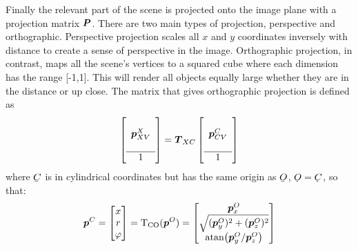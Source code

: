 Finally the relevant part of the scene is projected onto the image plane with a projection matrix $\P$. There are two main types of projection, perspective and orthographic. Perspective projection scales all $x$ and $y$ coordinates inversely with distance to create a sense of perspective in the image. Orthographic projection, in contrast, maps all the scene's vertices to a squared cube where each dimension has the range [-1,1]. This will render all objects equally large whether they are in the distance or up close. The matrix that gives orthographic projection is defined as
%
\begin{align}
\left[\begin{array}{c}
\\\dvec{p}_{XV}^{X}\\\\\hline 1
\end{array}\right]
= \mat{T}_{XC}
\left[\begin{array}{c}
\\\dvec{p}_{CV}^{C}\\\\\hline 1
\end{array}\right]
\end{align}
%
where $\ubar{C}$ is in cylindrical coordinates but has the same origin as $\ubar{O}$, $\udot{O} = \udot{C}$, so that:
%
\begin{align}\label{eq_cart2cyl}
\dvec{p}^C
= \bmat{x\\r\\\varphi}
= \mathrm{T_{CO}}(\dvec{p}^O)
= \bmat{\dvec{p}_x^O\\
\sqrt{(\dvec{p}_y^O)^2 + (\dvec{p}_z^O)^2}\\
\text{atan}\big(\dvec{p}_y^O / \dvec{p}_z^O\big)
}
\end{align}
%


